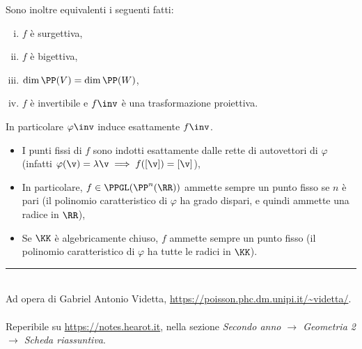 \documentclass[10pt,landscape]{article}
\begin{document}
\begin{multicols}{3}
		Sono inoltre equivalenti i seguenti fatti:
		
		\begin{enumerate}[(i)]
			\item $f$ è surgettiva,
			\item $f$ è bigettiva,
			\item $\dim \PP(V) = \dim \PP(W)$,
			\item $f$ è invertibile e $f\inv$ è una trasformazione proiettiva.
		\end{enumerate}
		
		In particolare $\varphi\inv$ induce esattamente $f\inv$.
		
		\begin{itemize}
			\item I punti fissi di $f$ sono indotti esattamente dalle rette di autovettori
				di $\varphi$ (infatti $\varphi(\v) = \lambda \v \implies f([\v]) = [\v]$),
			\item In particolare, $f \in \PPGL(\PP^n(\RR))$ ammette sempre un punto
				fisso se $n$ è pari (il polinomio caratteristico di $\varphi$ ha grado
				dispari, e quindi ammette una radice in $\RR$),
			\item Se $\KK$ è algebricamente chiuso, $f$ ammette sempre un punto fisso
				(il polinomio caratteristico di $\varphi$ ha tutte le radici in $\KK$).
		\end{itemize}
		
		\vfill
		\hrule
		~\\
		Ad opera di Gabriel Antonio Videtta, \url{https://poisson.phc.dm.unipi.it/~videtta/}.
		~\\Reperibile su
		\url{https://notes.hearot.it}, nella sezione \textit{Secondo anno $\to$ Geometria 2 $\to$ Scheda riassuntiva}.
	\end{multicols}
	
\end{document}
